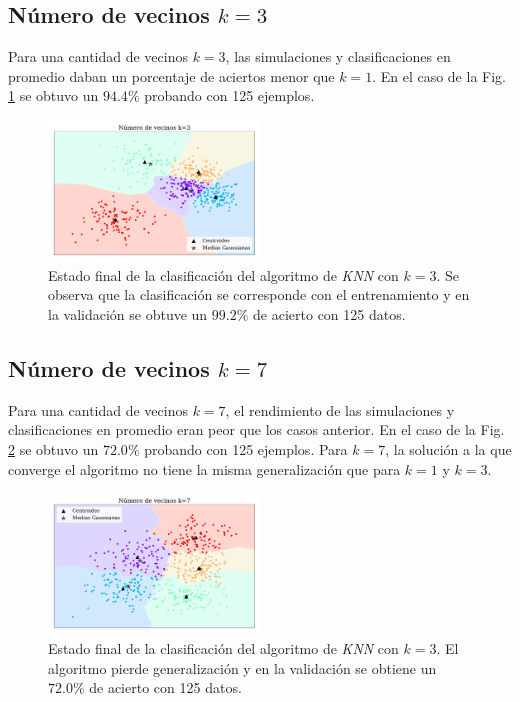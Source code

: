     \subsection*{Número de vecinos $k=3$}

    Para una cantidad de vecinos $k=3$, las  simulaciones y clasificaciones en promedio daban un porcentaje de aciertos menor que $k=1$. En el caso de la Fig.\,\ref{fig:ejer4_k_3} se obtuvo un $94.4\%$ probando con 125 ejemplos. 

\begin{figure}[H]
    \centering
    \includegraphics[width=0.5\textwidth]{plots/ejer_4_K-3_si_converge.pdf}
    \caption{Estado final de la clasificación del algoritmo de \emph{KNN} con $k=3$. Se observa que la clasificación se corresponde con el entrenamiento y en la validación se obtuve un $99.2\%$ de acierto con 125 datos.}
    \label{fig:ejer4_k_3}
\end{figure} 

    \subsection*{Número de vecinos $k=7$}

    Para una cantidad de vecinos $k=7$, el rendimiento de las  simulaciones y clasificaciones en promedio eran peor que los casos anterior. En el caso de la Fig.\,\ref{fig:ejer4_k_7} se obtuvo un $72.0\%$ probando con 125 ejemplos. Para $k=7$, la solución a la que converge el algoritmo no tiene la misma generalización que para $k=1$ y $k=3$.

\begin{figure}[H]
    \centering
    \includegraphics[width=0.5\textwidth]{plots/ejer_4_K-7_si_converge.pdf}
    \caption{Estado final de la clasificación del algoritmo de \emph{KNN} con $k=3$. El algoritmo pierde generalización y en la validación se obtiene un $72.0\%$ de acierto con 125 datos. }
    \label{fig:ejer4_k_7}
\end{figure} 
    

